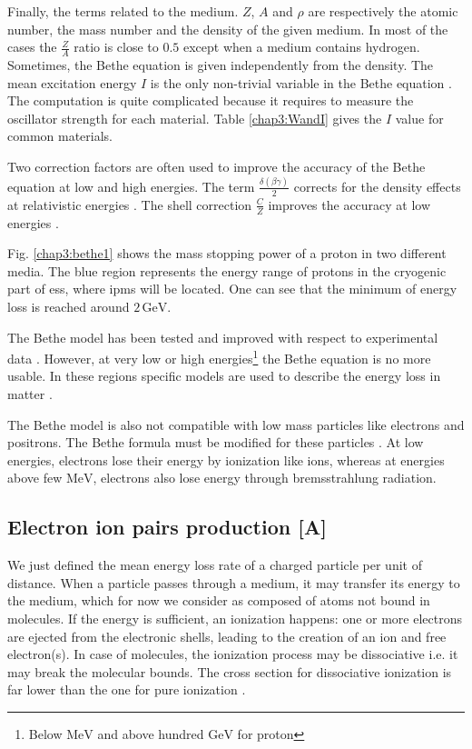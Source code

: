 \begin{refsection}
  Finally, the terms related to the medium. \(Z\), \(A\) and \(\rho\) are respectively the atomic number, the mass number and the density of the given medium. In most of the cases the \(\frac{Z}{A}\) ratio is close to \(0.5\) except when a medium contains hydrogen. Sometimes, the Bethe equation is given independently from the density.
  The mean excitation energy \(I\) is the only non-trivial variable in the Bethe equation \cite{Berger1984,Berger1993}. The computation is quite complicated because it requires to measure the oscillator strength for each material. Table \ref{chap3:WandI} gives the \(I\) value for common materials.

  Two correction factors are often used to improve the accuracy of the Bethe equation at low and high energies. The term \(\frac{\delta(\beta \gamma)}{2}\) corrects for the density effects at relativistic energies \cite{Sternheimer1984}. The shell correction \(\frac{C}{Z}\) improves the accuracy at low energies \cite{Bichsel2002}.

  

  Fig. \ref{chap3:bethe1} shows the mass stopping power of a proton in two different media. The blue region represents the energy range of protons in the cryogenic part of \acrshort{ess}, where \acrshort{ipm}s will be located. One can see that the minimum of energy loss is reached around \(2\,\mathrm{GeV}\).

  The Bethe model has been tested and improved with respect to experimental data \cite{Porter1990}. However, at very low or high energies\footnote{Below $\mathrm{MeV}$ and above hundred $\mathrm{GeV}$ for proton} the Bethe equation is no more usable. In these regions specific models are used to describe the energy loss in matter \cite{Ziegler1985, Allison1980}.

  The Bethe model is also not compatible with low mass particles like electrons and positrons. The Bethe formula must be modified for these particles \cite{Rieke1972}\cite[p. 452]{Tanabashi2018}. At low energies, electrons lose their energy by ionization like ions, whereas at energies above few \(\mathrm{MeV}\), electrons also lose energy through bremsstrahlung radiation.

  \subsection{Electron ion pairs production [A]}
  We just defined the mean energy loss rate of a charged particle per unit of distance. When a particle passes through a medium, it may transfer its energy to the medium, which for now we consider as composed of atoms not bound in molecules. If the energy is sufficient, an ionization happens: one or more electrons are ejected from the electronic shells, leading to the creation of an ion and free electron(s). In case of molecules, the ionization process may be dissociative i.e. it may break the molecular bounds. The cross section for dissociative ionization is far lower than the one for pure ionization \cite{Dimopoulou2004}.


\end{refsection}
